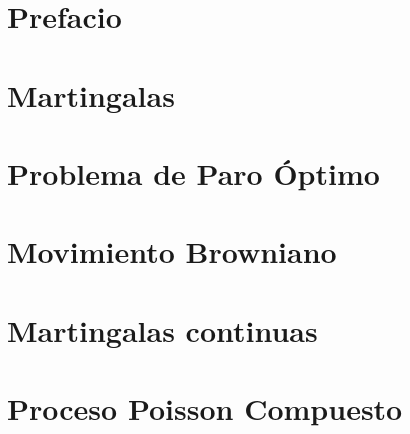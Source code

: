 \documentclass[a4paper]{book}
\theoremstyle{definition}
\theoremstyle{remark}
\begin{document}
\frontmatter





\tableofcontents

\chapter{Prefacio}


\mainmatter

\chapter{Martingalas}


\chapter{Problema de Paro Óptimo}


\chapter{Movimiento Browniano}


\chapter{Martingalas continuas}


\chapter{Proceso Poisson Compuesto}



\end{document}

